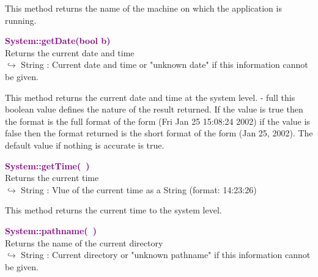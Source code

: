 This method returns the name of the machine on which the application is running.

\textcolor{purple}{\textbf{System::getDate(bool b)}}\label{System::getDate(bool b)}\\
Returns the current date and time\\ \hspace*{10mm}$\hookrightarrow$ String : Current date and time or "unknown date" if this information cannot be given.

\begin{tcolorbox}[width=\textwidth,myArgs,tabularx={ll|R}]

\end{tcolorbox}

This method returns the current date and time at the system level.
  - full this boolean value defines the nature of the result returned. If the value is true then the format is the full format of the form (Fri Jan 25 15:08:24 2002) if the value is false then the format returned is the short format of the form (Jan 25, 2002). The default value if nothing is accurate is true.

\textcolor{purple}{\textbf{System::getTime(~)}}\label{System::getTime()}\\
Returns the current time\\ \hspace*{10mm}$\hookrightarrow$ String : Vlue of the current time as a String (format: 14:23:26)

This method returns the current time to the system level.

\textcolor{purple}{\textbf{System::pathname(~)}}\label{System::pathname()}\\
Returns the name of the current directory\\ \hspace*{10mm}$\hookrightarrow$ String : Current directory or "unknown pathname" if this information cannot be given.

